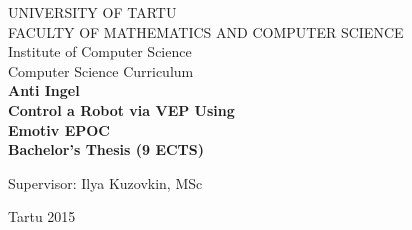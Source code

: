 
\begin{center}
\thispagestyle{empty}
\large{UNIVERSITY OF TARTU}\\
\large{FACULTY OF MATHEMATICS AND COMPUTER SCIENCE}\\
\large{Institute of Computer Science}\\
\large{Computer Science Curriculum}\\
\vspace{160pt}
\Large{\bf Anti Ingel}\\
\vspace{6pt}
\LARGE{\textbf{Control a Robot via VEP Using \\Emotiv EPOC}}\\
\vspace{12pt}
\large{\bf Bachelor's Thesis (9 ECTS)}
\vspace{63pt}
\end{center}
\hfill \Large{Supervisor: Ilya Kuzovkin, MSc}
\vfill
\begin{center}
\large{Tartu 2015}
\end{center}
